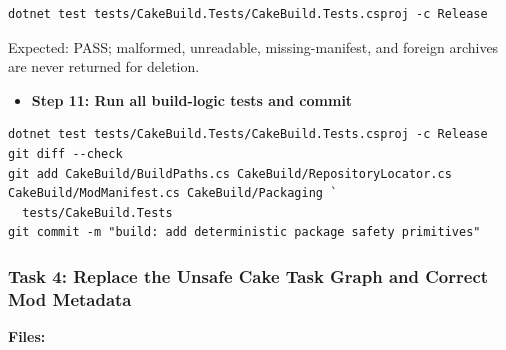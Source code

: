 \documentclass[
  10pt,
  letterpaper,
]{article}
\providecommand{\tightlist}{%
  \setlength{\itemsep}{0pt}\setlength{\parskip}{0pt}}
\begin{document}
\begin{lstlisting}
dotnet test tests/CakeBuild.Tests/CakeBuild.Tests.csproj -c Release
\end{lstlisting}

Expected: PASS; malformed, unreadable, missing-manifest, and foreign
archives are never returned for deletion.

\begin{itemize}
\tightlist
\item[$\square$]
  \textbf{Step 11: Run all build-logic tests and commit}
\end{itemize}

\begin{lstlisting}
dotnet test tests/CakeBuild.Tests/CakeBuild.Tests.csproj -c Release
git diff --check
git add CakeBuild/BuildPaths.cs CakeBuild/RepositoryLocator.cs CakeBuild/ModManifest.cs CakeBuild/Packaging `
  tests/CakeBuild.Tests
git commit -m "build: add deterministic package safety primitives"
\end{lstlisting}

\subsubsection{Task 4: Replace the Unsafe Cake Task Graph and Correct
Mod
Metadata}\label{task-4-replace-the-unsafe-cake-task-graph-and-correct-mod-metadata}

\textbf{Files:}
\end{document}
